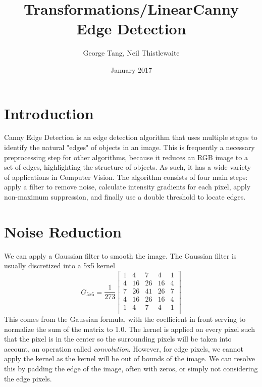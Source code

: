 \documentclass{article}
\title{Transformations/Linear}
\title{Canny Edge Detection}
\author{George Tang, Neil Thistlewaite}
\affil{Computer Vision Club}
\date{January 2017}
\begin{document}
\maketitle

\section{Introduction}

Canny Edge Detection is an edge detection algorithm that uses multiple stages to identify the natural "edges" of objects in an image. This is frequently a necessary preprocessing step for other algorithms, because it reduces an RGB image to a set of edges, highlighting the structure of objects. As such, it has a wide variety of applications in Computer Vision. The algorithm consists of four main steps: apply a filter to remove noise, calculate intensity gradients for each pixel, apply non-maximum suppression, and finally use a double threshold to locate edges. 

\section{Noise Reduction}
We can apply a Gaussian filter to smooth the image. The Gaussian filter is usually discretized into a 5x5 kernel 
\[
G_{5x5}=
\frac{1}{273}
\begin{bmatrix}
    1 & 4  & 7  & 4 & 1\\
    4 & 16 & 26 & 16 & 4\\
    7 & 26 & 41 & 26 & 7\\
    4 & 16 & 26 & 16 & 4\\
    1 & 4  & 7  & 4 & 1\\
\end{bmatrix}
\]
This comes from the Gaussian formula, with the coefficient in front serving to normalize the sum of the matrix to 1.0. The kernel is applied on every pixel such that the pixel is in the center so the surrounding pixels will be taken into account, an operation called \textit{convolution}. However, for edge pixels, we cannot apply the kernel as the kernel will be out of bounds of the image. We can resolve this by padding the edge of the image, often with zeros, or simply not considering the edge pixels.  
\end{document}
